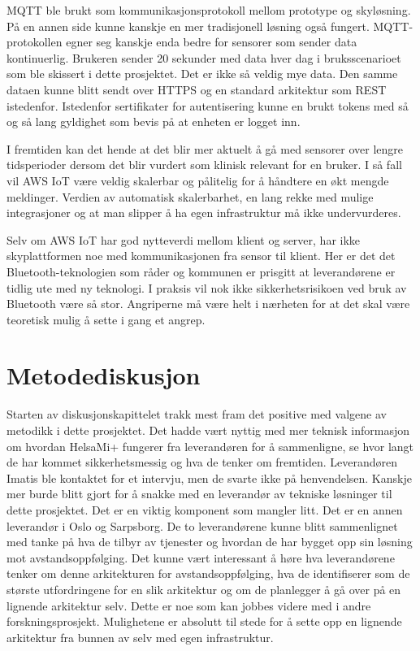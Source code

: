 MQTT ble brukt som kommunikasjonsprotokoll mellom prototype og skyløsning.
På en annen side kunne kanskje en mer tradisjonell løsning også fungert.
MQTT-protokollen egner seg kanskje enda bedre for sensorer
som sender data kontinuerlig. Brukeren sender 20 sekunder med data hver dag i bruksscenarioet som ble skissert i dette prosjektet. Det er ikke så veldig
mye data. Den samme dataen kunne blitt sendt over HTTPS og en standard arkitektur som REST istedenfor.
Istedenfor sertifikater for autentisering kunne en brukt tokens med så og så lang gyldighet som bevis på at enheten er logget inn.

I fremtiden kan det hende at det blir mer aktuelt å gå med sensorer over lengre tidsperioder dersom det blir vurdert som klinisk relevant
for en bruker. I så fall vil AWS IoT være veldig skalerbar og pålitelig for å håndtere en økt mengde meldinger. Verdien av
automatisk skalerbarhet, en lang rekke med mulige integrasjoner og at man slipper å ha egen infrastruktur må ikke undervurderes.

Selv om AWS IoT har god nytteverdi mellom klient og server, har ikke skyplattformen noe med kommunikasjonen fra sensor til klient. Her er det
det Bluetooth-teknologien som råder og kommunen er prisgitt at leverandørene er tidlig ute med ny teknologi. I praksis vil nok ikke
sikkerhetsrisikoen ved bruk av Bluetooth være så stor. Angriperne må være helt i nærheten for at det skal være teoretisk mulig å sette i gang
et angrep.

\section{Metodediskusjon}
Starten av diskusjonskapittelet trakk mest fram det positive med valgene av metodikk i dette prosjektet.
Det hadde vært nyttig med mer teknisk informasjon om hvordan HelsaMi+ fungerer fra leverandøren for å sammenligne,
se hvor langt de har kommet sikkerhetsmessig og hva de tenker om fremtiden. Leverandøren Imatis ble kontaktet for et
intervju, men de svarte ikke på henvendelsen. Kanskje mer burde blitt gjort for å snakke med en leverandør av tekniske løsninger
til dette prosjektet. Det er en viktig komponent som mangler litt. Det er en annen leverandør i Oslo og Sarpsborg.
De to leverandørene kunne blitt sammenlignet med tanke på hva de tilbyr av tjenester og hvordan de har bygget opp sin løsning
mot avstandsoppfølging. Det kunne vært interessant å høre hva leverandørene tenker om denne arkitekturen for avstandsoppfølging,
hva de identifiserer som de største utfordringene for en slik arkitektur og om de planlegger å gå over på en lignende
arkitektur selv. Dette er noe som kan jobbes videre med i andre forskningsprosjekt. Mulighetene er absolutt til stede
for å sette opp en lignende arkitektur fra bunnen av selv med egen infrastruktur.

